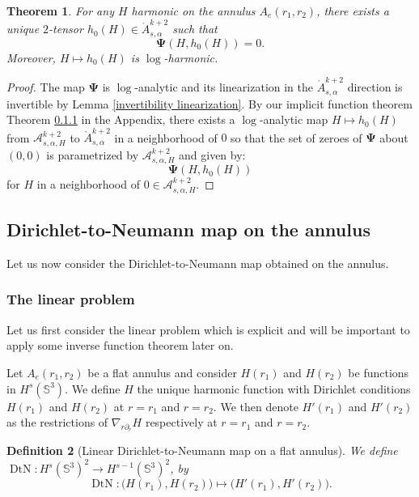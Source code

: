 \documentclass[12pt]{article}
\newtheorem{thm}{Theorem}[section]
\newtheorem{defn}[thm]{Definition}
\newcommand{\calA}{{\mathcal A}}
\begin{document}
    \begin{thm}\label{Dirichlet problem}
        For any $ H $ harmonic on the annulus $A_e(r_1,r_2)$, there exists a unique $2$-tensor $h_0(H)\in \mathring{A}_{s,\alpha}^{k+2}$ such that $$\mathbf{\Psi}(H,h_0(H)) = 0.$$
        Moreover, $H\mapsto h_0(H)$ is $\log$-harmonic.
    \end{thm}
    \begin{proof}
        The map $\mathbf{\Psi}$ is $\log$-analytic and its linearization in the $\mathring{A}_{s,\alpha}^{k+2}$ direction is invertible by Lemma \ref{invertibility linearization}. By our implicit function theorem Theorem \ref{} in the Appendix, there exists a $\log$-analytic map $H\mapsto h_0(H)$ from $\calA_{s,\alpha,H}^{k+2}$ to $\mathring{A}_{s,\alpha}^{k+2}$ in a neighborhood of $0$ so that the set of zeroes of $\mathbf{\Psi}$ about $(0,0)$ is parametrized by $\calA_{s,\alpha,H}^{k+2}$ and given by: 
        $$\mathbf{\Psi}(H,h_0(H))$$
        for $H$ in a neighborhood of  $0\in \calA_{s,\alpha,H}^{k+2}$.
    \end{proof}
    
    \subsection{Dirichlet-to-Neumann map on the annulus}
    
    Let us now consider the Dirichlet-to-Neumann map obtained on the annulus.
    
    \subsubsection{The linear problem}
    
    Let us first consider the linear problem which is explicit and will be important to apply some inverse function theorem later on. 
    
    Let $A_e(r_1,r_2)$ be a flat annulus and consider $H(r_1)$ and $H(r_2)$ be functions in $H^s(\mathbb{S}^3)$. We define $ H $ the unique harmonic function with Dirichlet conditions $H(r_1)$ and $H(r_2)$ at $r=r_1$ and $r=r_2$. We then denote $H'(r_1)$ and $H'(r_2)$ as the restrictions of $\nabla_{r\partial_r}H$ respectively at $r=r_1$ and
    $r=r_2$.
    
    \begin{defn}[Linear Dirichlet-to-Neumann map on a flat annulus]
        We define $\operatorname{DtN}: H^s(\mathbb{S}^3)^2 \to H^{s-1}(\mathbb{S}^3)^2$, by $$\operatorname{DtN}:\big(H(r_1),H(r_2)\big)\mapsto \big(H'(r_1),H'(r_2)\big).$$
    \end{defn}
    
\end{document}
